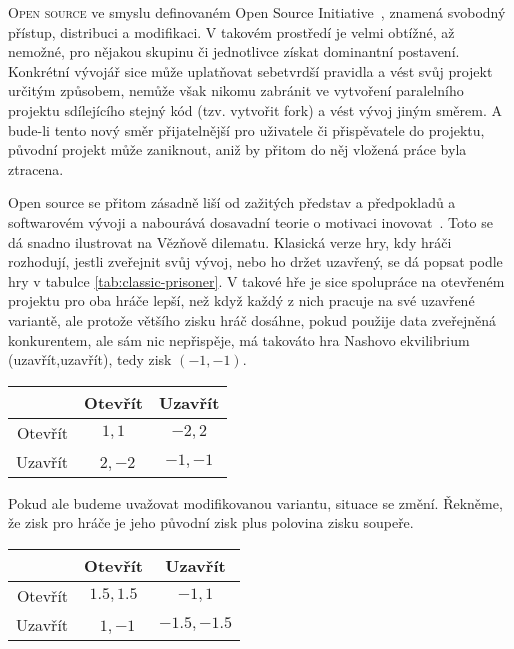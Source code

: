\listoftodos
\hrulefill
\begin{multicols}{2}
\lettrine[nindent=0em,lines=3]{O}{pen source} ve smyslu definovaném Open Source Initiative~\cite{OSI-2011}, znamená svobodný přístup, distribuci a modifikaci. V takovém prostředí je velmi obtížné, až nemožné, pro nějakou skupinu či jednotlivce získat dominantní postavení. Konkrétní vývojář sice může uplatňovat sebetvrdší pravidla a vést svůj projekt určitým způsobem, nemůže však nikomu zabránit ve vytvoření paralelního projektu sdílejícího stejný kód (tzv. vytvořit fork) a vést vývoj jiným směrem. A bude-li tento nový směr přijatelnější pro uživatele či přispěvatele do projektu, původní projekt může zaniknout, aniž by přitom do něj vložená práce byla ztracena.

Open source se přitom zásadně liší od zažitých představ a předpokladů a softwarovém vývoji a nabourává dosavadní teorie o motivaci inovovat~\cite{promise-of-research-opensource}. Toto se dá snadno ilustrovat na Vězňově dilematu. Klasická verze hry, kdy hráči rozhodují, jestli zveřejnit svůj vývoj, nebo ho držet uzavřený, se dá popsat podle hry v tabulce \ref{tab:classic-prisoner}. V takové hře je sice spolupráce na otevřeném projektu pro oba hráče lepší, než když každý z nich pracuje na své uzavřené variantě, ale protože většího zisku hráč dosáhne, pokud použije data zveřejněná konkurentem, ale sám nic nepřispěje, má takováto hra Nashovo ekvilibrium (uzavřít,uzavřít), tedy zisk $(-1,-1)$.

\begin{Figure}
\label{tab:classic-prisoner}
\begin{center}
\begin{tabular}{r| c c}
		& Otevřít & Uzavřít \\
		\hline
	Otevřít & $1,1$ & $-2,2$ \\
	Uzavřít & $2,-2$ & $-1,-1$ \\
\end{tabular}
\end{center}
\end{Figure}

Pokud ale budeme uvažovat modifikovanou variantu, situace se změní. Řekněme, že zisk pro hráče je jeho původní zisk plus polovina zisku soupeře.

\begin{Figure}
\label{tab:new-prisoner}
\begin{center}
\begin{tabular}{r| c c}
		& Otevřít & Uzavřít \\
		\hline
	Otevřít & $1.5,1.5$ & $-1,1$ \\
	Uzavřít & $1,-1$ & $-1.5,-1.5$ \\
\end{tabular}
\end{center}
\end{Figure}


\end{multicols}
